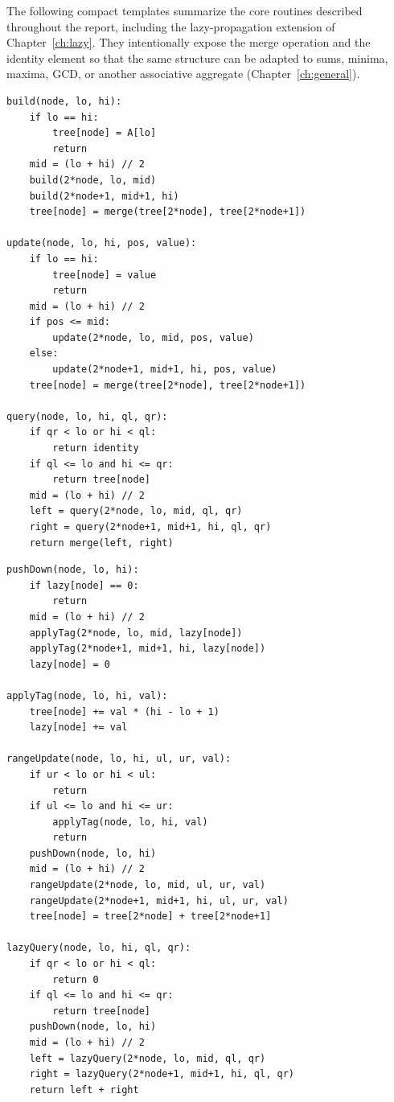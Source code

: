 The following compact templates summarize the core routines described throughout the report, including the lazy-propagation extension of Chapter~\ref{ch:lazy}. They intentionally expose the merge operation and the identity element so that the same structure can be adapted to sums, minima, maxima, GCD, or another associative aggregate (Chapter~\ref{ch:general}).

\begin{lstlisting}[caption={Core build, point-update, and range-query routines (no lazy propagation).}]
build(node, lo, hi):
    if lo == hi:
        tree[node] = A[lo]
        return
    mid = (lo + hi) // 2
    build(2*node, lo, mid)
    build(2*node+1, mid+1, hi)
    tree[node] = merge(tree[2*node], tree[2*node+1])

update(node, lo, hi, pos, value):
    if lo == hi:
        tree[node] = value
        return
    mid = (lo + hi) // 2
    if pos <= mid:
        update(2*node, lo, mid, pos, value)
    else:
        update(2*node+1, mid+1, hi, pos, value)
    tree[node] = merge(tree[2*node], tree[2*node+1])

query(node, lo, hi, ql, qr):
    if qr < lo or hi < ql:
        return identity
    if ql <= lo and hi <= qr:
        return tree[node]
    mid = (lo + hi) // 2
    left = query(2*node, lo, mid, ql, qr)
    right = query(2*node+1, mid+1, hi, ql, qr)
    return merge(left, right)
\end{lstlisting}

\begin{lstlisting}[caption={Lazy-propagation extension for range-add / range-sum (Chapter~\ref{ch:lazy}).}]
pushDown(node, lo, hi):
    if lazy[node] == 0:
        return
    mid = (lo + hi) // 2
    applyTag(2*node, lo, mid, lazy[node])
    applyTag(2*node+1, mid+1, hi, lazy[node])
    lazy[node] = 0

applyTag(node, lo, hi, val):
    tree[node] += val * (hi - lo + 1)
    lazy[node] += val

rangeUpdate(node, lo, hi, ul, ur, val):
    if ur < lo or hi < ul:
        return
    if ul <= lo and hi <= ur:
        applyTag(node, lo, hi, val)
        return
    pushDown(node, lo, hi)
    mid = (lo + hi) // 2
    rangeUpdate(2*node, lo, mid, ul, ur, val)
    rangeUpdate(2*node+1, mid+1, hi, ul, ur, val)
    tree[node] = tree[2*node] + tree[2*node+1]

lazyQuery(node, lo, hi, ql, qr):
    if qr < lo or hi < ql:
        return 0
    if ql <= lo and hi <= qr:
        return tree[node]
    pushDown(node, lo, hi)
    mid = (lo + hi) // 2
    left = lazyQuery(2*node, lo, mid, ql, qr)
    right = lazyQuery(2*node+1, mid+1, hi, ql, qr)
    return left + right
\end{lstlisting}

